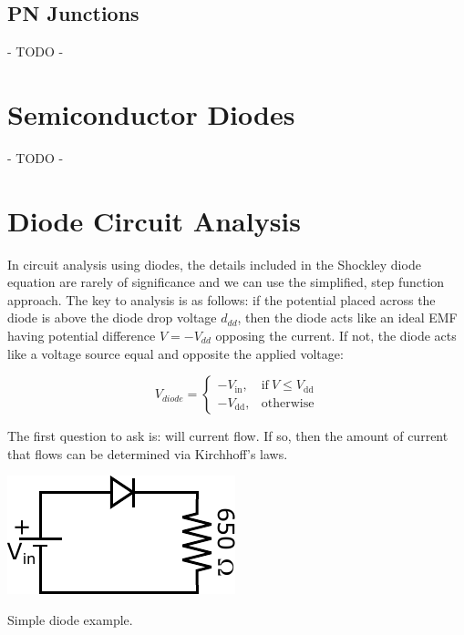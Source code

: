 \documentclass{tufte-book}
\begin{document}
\subsection{PN Junctions}
- TODO -
\section{Semiconductor Diodes}
- TODO -
\section{Diode Circuit Analysis}
In circuit analysis using diodes, the details included in the Shockley diode equation are rarely of significance and we can use the simplified, step function approach. The key to analysis is as follows: if the potential placed across the diode is above the diode drop voltage $d_{dd}$, then the diode acts like an ideal EMF having potential difference $V = -V_{dd}$ opposing the current. If not, the diode acts like a voltage source equal and opposite the applied voltage:

\begin{equation}
\label{eq:effective_diode_source}
    V_{diode}=
    \begin{cases}
      -V_\text{in}, & \text{if}\ V\le V_\text{dd} \\
      -V_\text{dd}, & \text{otherwise}
    \end{cases}
  \end{equation}

The first question to ask is: will current flow. If so, then the amount of current that flows can be determined via Kirchhoff's laws.

\begin{marginfigure}
  \includegraphics[]{simple_diode_ex}
  \caption{Simple diode example.}
  \label{fig:simple_diode_ex}
\end{marginfigure}
\end{document}
